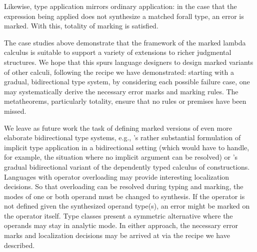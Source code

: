 Likewise, type application mirrors ordinary application: in the case that the expression being applied does not synthesize a matched forall type, an error is marked. With this, totality of marking is satisfied.
%
\begin{mathpar}

\end{mathpar}

The case studies above demonstrate that the framework of the marked lambda calculus is suitable to support a variety of extensions to richer judgmental structures.
We hope that this spurs language designers to design marked variants of other calculi, following the
recipe we have demonstrated: starting with a gradual, bidirectional type system, by considering each
possible failure case, one may systematically derive the necessary error marks and marking rules.
The metatheorems, particularly totality, ensure that no rules or premises have been missed.

We leave as future work the task of defining marked versions of even more elaborate bidirectional
type systems, e.g., \citet{dunfield2013}'s rather substantial formulation of implicit type
application in a bidirectional setting (which would have to handle, for example, the situation where
no implicit argument can be resolved) or \citet{lennonbertrand2022}'s gradual bidirectional
variant of the dependently typed calculus of constructions.
Languages with operator overloading may provide interesting localization decisions.
So that overloading can be resolved during typing and marking, the modes of one or both operand must be changed to synthesis.
If the operator is not defined given the synthesized operand type(s), an error might be marked on the operator itself.
Type classes \cite{wadler1989} present a symmetric alternative where the operands may stay in analytic mode.
In either approach, the necessary error marks and localization decisions may be arrived at via the recipe we have described.
